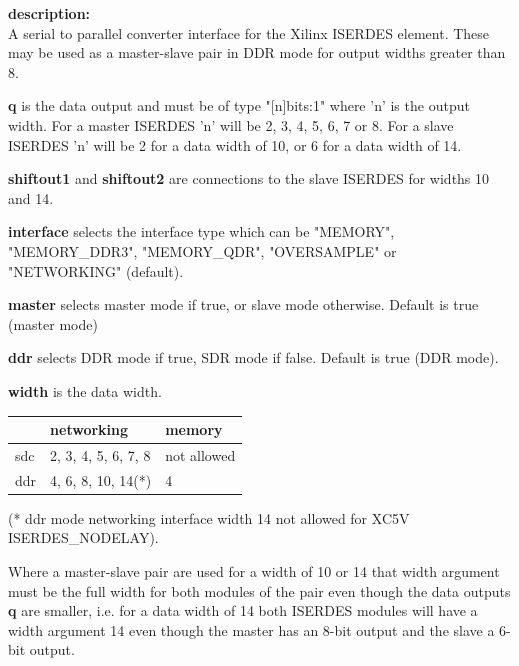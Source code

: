             {\bf description:} \\
            A serial to parallel converter interface for the Xilinx
            ISERDES element. These may be used as a master-slave pair
            in DDR mode for output widths greater than 8.
            
            {\bf q} is the data output and must be of type "[n]bits:1"
            where 'n' is the output width. For a master ISERDES 'n' will be
            2, 3, 4, 5, 6, 7 or 8. For a slave ISERDES  'n' will be 2 for a
            data width of 10, or 6 for a data width of 14.
            
            {\bf shiftout1} and {\bf shiftout2} are connections to the
            slave ISERDES for widths 10 and 14.
            
            {\bf interface} selects the interface type which can be "MEMORY",
            "MEMORY\_DDR3", "MEMORY\_QDR", "OVERSAMPLE" or "NETWORKING" (default).
            
            {\bf master} selects master mode if true, or slave mode otherwise.
            Default is true (master mode)
            
            {\bf ddr} selects DDR mode if true, SDR mode if false.
            Default is true (DDR mode).
            
            {\bf width} is the data width.
            
            \begin{tabular}{| l | l | l |}
            \hline
                & networking          & memory \\
            \hline \hline
            sdc & 2, 3, 4, 5, 6, 7, 8 & not allowed \\ \hline
            ddr & 4, 6, 8, 10, 14(*)  & 4           \\ \hline
            \end{tabular}

            (* ddr mode networking interface width 14 not allowed for XC5V
            ISERDES\_NODELAY).
            
            Where a master-slave pair are used for a width of 10 or 14 that
            width argument must be the full width for both modules of the pair
            even though the data outputs {\bf q} are smaller, i.e. for a data
            width of 14 both ISERDES modules will have a width argument 14 even
            though the master has an 8-bit output and the slave a 6-bit output.
            
